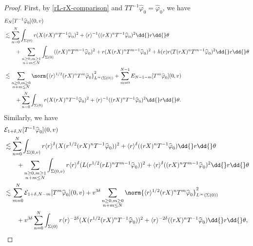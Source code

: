 \documentclass[10pt, reqno]{amsart}
\begin{document}
\begin{proof}
First, by \cref{rL-rX-comparison} and \(TT^{-1}\widehat{\varphi{}}_0 =
\widehat{\varphi{}}_0\), we have
\begin{equation}\label{Tinv-estimate-0}
\begin{split}
&E_N[T^{-1}\widehat{\varphi{}}_0](0,v) \\
&\lesssim \sum_{n=0}^N\int _{\Sigma{}(0)} r(X(rX)^nT^{-1}\widehat{\varphi{}}_0)^2 + \langle{}r\rangle{}^{-1}((rX)^nT^{-1}\widehat{\varphi{}}_0)^2 \dd{}r\dd{}\theta{} \\
&\qquad + \sum_{\substack{n\ge 0,m\ge 1 \\ n+m\le N }} \int _{\Sigma{}(0)}((rX)^nT^{m-1}\widehat{\varphi{}}_0)^2 + r(X(rX)^nT^{m-1}\widehat{\varphi{}}_0)^2 + h(r)r(T(rX)^nT^{m-1}\widehat{\varphi{}}_0)^2 \dd{}r\dd{}\theta{} \\
&\lesssim  \sum_{\substack{n\ge 0,m\ge 0 \\ n+m\le N }}\norm{\langle{}r\rangle^{1/2}(rX)^nT^m\widehat{\varphi{}}_0}_{L^\infty(\Sigma{}(0))}^2 + \sum_{m=0}^{N-1}E_{N-1-m}[T^m\widehat{\varphi{}}_0](0,v) \\
&\qquad + \sum_{n=0}^N\int _{\Sigma{}(0)} r(X(rX)^nT^{-1}\widehat{\varphi{}}_0)^2 + \langle{}r\rangle{}^{-1}((rX)^nT^{-1}\widehat{\varphi{}}_0)^2\dd{}r\dd{}\theta{}.
\end{split}
\end{equation}
Similarly, we have
\begin{equation}\label{Tinv-estimate-1}
\begin{split}
&\mathcal{E}_{1+\delta{},N}[T^{-1}\widehat{\varphi{}}_{0}](0,v) \\
&\lesssim \sum_{n=0}^N \int _{\Sigma{}(0,v)}  r\langle{}r\rangle^\delta{}(X(r^{1/2}(rX)^nT^{-1}\widehat{\varphi{}}_0))^2 + \langle{}r\rangle^\delta{}((rX)^nT^{-1}\widehat{\varphi{}}_0) \dd{}r\dd{}\theta{}\\
&\qquad + \sum_{\substack{n\ge 0,m\ge 1 \\ n+m\le N }} \int _{\Sigma{}(0,v)} r\langle{}r\rangle^\delta{}(L(r^{1/2}(rL)^nT^{m-1}\widehat{\varphi{}}_0))^2 + \langle{}r\rangle^{\delta{}}((rX)^nT^{m-1}\widehat{\varphi{}}_0)^2 \dd{}r\dd{}\theta{} \\
&\lesssim  \sum_{m=0}^N\mathcal{E}_{1+\delta{},N-m}[T^m\widehat{\varphi{}}_0](0,v) + v^{3\delta{}}\sum_{\substack{n\ge 0,m\ge 0 \\ n+m\le N }}\norm{\langle{}r\rangle^{1/2}(rX)^nT^{m}\widehat{\varphi{}}_0}_{L^\infty(\Sigma{}(0))}^2\\
&\qquad + v^{3\delta{}}\sum_{n=0}^N \int _{\Sigma{}(0)}  r\langle{}r\rangle^{-2\delta{}}(X(r^{1/2}(rX)^nT^{-1}\widehat{\varphi{}}_0))^2 + \langle{}r\rangle^{-2\delta{}}((rX)^nT^{-1}\widehat{\varphi{}}_0) \dd{}r\dd{}\theta{},

\end{split}
\end{equation}
\end{proof}
\end{document}
